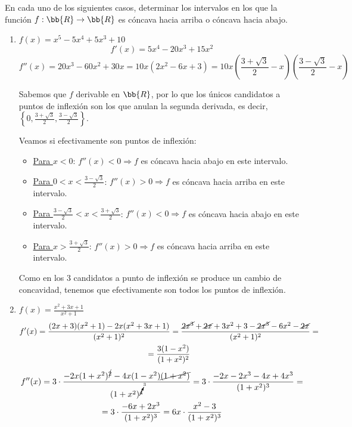 \begin{ejercicio}
    En cada uno de los siguientes casos, determinar los intervalos en los que la función $f:\bb{R}\to \bb{R}$ es cóncava hacia arriba o cóncava hacia abajo.
    \begin{enumerate}
        \item $f(x)=x^5-5x^4+5x^3 + 10$
        \begin{equation*}
            f'(x) = 5x^4 -20x^3+15x^2
        \end{equation*}
        \begin{equation*}
            f''(x)=20x^3 -60x^2 +30x = 10x(2x^2-6x+3) = 10x\left(\frac{3+\sqrt{3}}{2}-x\right)\left(\frac{3-\sqrt{3}}{2}-x\right)
        \end{equation*}

        Sabemos que $f$ derivable en $\bb{R}$, por lo que los únicos candidatos a puntos de inflexión son los que anulan la segunda derivada, es decir, $\left\{0, \frac{3+\sqrt{3}}{2}, \frac{3-\sqrt{3}}{2}  \right\}$.

        Veamos si efectivamente son puntos de inflexión:
        \begin{itemize}
            \item \underline{Para $x<0$}:
            $f''(x)<0\Longrightarrow f$ es cóncava hacia abajo en este intervalo.

            \item \underline{Para $0<x< \frac{3-\sqrt{3}}{2}$}:
            $f''(x)>0\Longrightarrow f$ es cóncava hacia arriba en este intervalo.

            \item \underline{Para $ \frac{3-\sqrt{3}}{2} < x <  \frac{3+\sqrt{3}}{2}$}:
            $f''(x)<0\Longrightarrow f$ es cóncava hacia abajo en este intervalo.
            
            \item \underline{Para $x> \frac{3+\sqrt{3}}{2}$}:
            $f''(x)>0\Longrightarrow f$ es cóncava hacia arriba en este intervalo.
        \end{itemize}
        Como en los 3 candidatos a punto de inflexión se produce un cambio de concavidad, tenemos que efectivamente son todos los puntos de inflexión.
        
        \item $f(x)=\frac{x^2+3x+1}{x^2+1}$
        \begin{multline*}
            f'(x) = \frac{(2x+3)(x^2+1)-2x(x^2+3x+1)}{(x^2+1)^2} = \frac{\cancel{2x^3}+\cancel{2x}+3x^2+3-\cancel{2x^3}-6x^2-\cancel{2x}}{(x^2+1)^2} =\\= \frac{3(1-x^2)}{(1+x^2)^2}
        \end{multline*}
        \begin{multline*}
            f''(x) = 3\cdot \frac{-2x(1+x^2)^{\cancel{2}} -4x(1-x^2)\cancel{(1+x^2)}}{(1+x^2)^{\cancelto{3}{4}}}
            = 3\cdot \frac{-2x-2x^3-4x+4x^3}{(1+x^2)^3}
            =\\=
            3\cdot \frac{-6x+2x^3}{(1+x^2)^3}
            = 6x\cdot \frac{x^2-3}{(1+x^2)^3}
        \end{multline*}


\end{enumerate}
\end{ejercicio}
